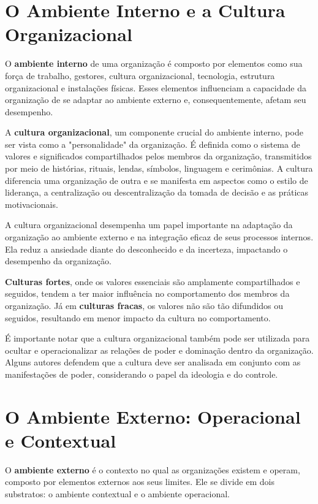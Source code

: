 \section{O Ambiente Interno e a Cultura Organizacional}

O \textbf{ambiente interno} de uma organização é composto por elementos como sua força de trabalho, gestores, cultura organizacional, tecnologia, estrutura organizacional e instalações físicas. Esses elementos influenciam a capacidade da organização de se adaptar ao ambiente externo e, consequentemente, afetam seu desempenho.

A \textbf{cultura organizacional}, um componente crucial do ambiente interno, pode ser vista como a "personalidade" da organização. É definida como o sistema de valores e significados compartilhados pelos membros da organização, transmitidos por meio de histórias, rituais, lendas, símbolos, linguagem e cerimônias. A cultura diferencia uma organização de outra e se manifesta em aspectos como o estilo de liderança, a centralização ou descentralização da tomada de decisão e as práticas motivacionais.

A cultura organizacional desempenha um papel importante na adaptação da organização ao ambiente externo e na integração eficaz de seus processos internos. Ela reduz a ansiedade diante do desconhecido e da incerteza, impactando o desempenho da organização.

\textbf{Culturas fortes}, onde os valores essenciais são amplamente compartilhados e seguidos, tendem a ter maior influência no comportamento dos membros da organização. Já em \textbf{culturas fracas}, os valores não são tão difundidos ou seguidos, resultando em menor impacto da cultura no comportamento.

É importante notar que a cultura organizacional também pode ser utilizada para ocultar e operacionalizar as relações de poder e dominação dentro da organização. Alguns autores defendem que a cultura deve ser analisada em conjunto com as manifestações de poder, considerando o papel da ideologia e do controle.

\section{O Ambiente Externo: Operacional e Contextual}

O \textbf{ambiente externo} é o contexto no qual as organizações existem e operam, composto por elementos externos aos seus limites. Ele se divide em dois substratos: o ambiente contextual e o ambiente operacional.

